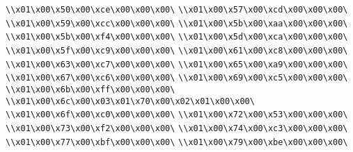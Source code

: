 \verb|\\x01\x00\x50\x00\xce\x00\x00\x00\|\newline
\verb|\\x01\x00\x57\x00\xcd\x00\x00\x00\|\newline
\verb|\\x01\x00\x59\x00\xcc\x00\x00\x00\|\newline
\verb|\\x01\x00\x5b\x00\xaa\x00\x00\x00\|\newline
\verb|\\x01\x00\x5b\x00\xf4\x00\x00\x00\|\newline
\verb|\\x01\x00\x5d\x00\xca\x00\x00\x00\|\newline
\verb|\\x01\x00\x5f\x00\xc9\x00\x00\x00\|\newline
\verb|\\x01\x00\x61\x00\xc8\x00\x00\x00\|\newline
\verb|\\x01\x00\x63\x00\xc7\x00\x00\x00\|\newline
\verb|\\x01\x00\x65\x00\xa9\x00\x00\x00\|\newline
\verb|\\x01\x00\x67\x00\xc6\x00\x00\x00\|\newline
\verb|\\x01\x00\x69\x00\xc5\x00\x00\x00\|\newline
\verb|\\x01\x00\x6b\x00\xff\x00\x00\x00\|\newline
\verb|\\x01\x00\x6c\x00\x03\x01\x70\x00\x02\x01\x00\x00\|\newline
\verb|\\x01\x00\x6f\x00\xc0\x00\x00\x00\|\newline
\verb|\\x01\x00\x72\x00\x53\x00\x00\x00\|\newline
\verb|\\x01\x00\x73\x00\xf2\x00\x00\x00\|\newline
\verb|\\x01\x00\x74\x00\xc3\x00\x00\x00\|\newline
\verb|\\x01\x00\x77\x00\xbf\x00\x00\x00\|\newline
\verb|\\x01\x00\x79\x00\xbe\x00\x00\x00\|\newline
